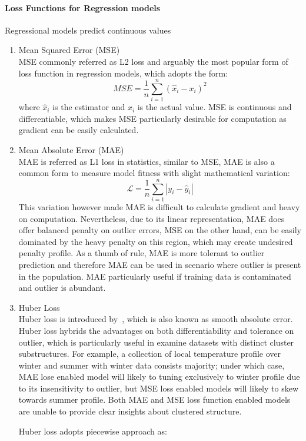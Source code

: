 \paragraph {Loss Functions for Regression models}
Regressional models predict continuous values
\begin{enumerate}
    \item Mean Squared Error (MSE) \\
MSE commonly referred as L2 loss and arguably the most popular form of loss function in regression models, which adopts the form:
\begin{equation}
    MSE = \frac{1}{n}\sum_{i=1}^n (\hat{x}_i - x_i)^2
\end{equation}
where $\hat{x}_i$ is the estimator and $x_i$ is the actual value. MSE is continuous and differentiable, which makes MSE particularly desirable for computation as gradient can be easily calculated. 
    \item Mean Absolute Error (MAE) \\
MAE is referred as L1 loss in statistics, similar to MSE, MAE is also a common form to measure model fitness with slight mathematical variation:
\begin{equation}
    \mathcal{L} = \frac {1}{n} \sum_{i=1}^n |y_i - \hat{y}_i|
\end{equation}
This variation however made MAE is difficult to calculate gradient and heavy on computation. Nevertheless, due to its linear representation, MAE does offer balanced penalty on outlier errors, MSE on the other hand, can be easily dominated by the heavy penalty on this region, which may create undesired penalty profile. As a thumb of rule, MAE is more tolerant to outlier prediction and therefore MAE can be used in scenario where outlier is present in the population. MAE particularly useful if training data is contaminated and outlier is abundant. 
    \item Huber Loss\\
Huber loss is introduced by~\citet{Huber_1964}, which is also known as smooth absolute error. Huber loss hybrids the advantages on both differentiability and tolerance on outlier, which is particularly useful in examine datasets with distinct cluster substructures. For example, a collection of local temperature profile over winter and summer with winter data consists majority; under which case, MAE lose enabled model will likely to tuning exclusively to winter profile due to its insensitivity to outlier, but MSE loss enabled models will likely to skew towards summer profile. Both MAE and MSE loss function enabled models are unable to provide clear insights about clustered structure. 
\par 
Huber loss adopts piecewise approach as: 


\end{enumerate}

